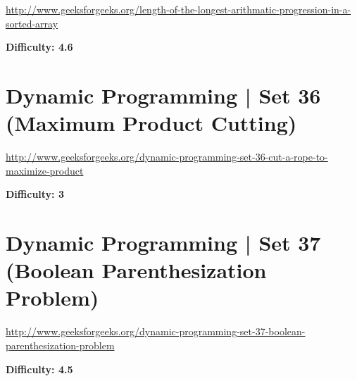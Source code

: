 \url{http://www.geeksforgeeks.org/length-of-the-longest-arithmatic-progression-in-a-sorted-array}

\textbf{Difficulty: 4.6}


\textbf{}

\RayNotesBegin



\RayNotesEnd

\textbf{}


\section{Dynamic Programming | Set 36 (Maximum Product Cutting)
  \label{secGFGDPSet36MaxProdCut}}

\url{http://www.geeksforgeeks.org/dynamic-programming-set-36-cut-a-rope-to-maximize-product}

\textbf{Difficulty: 3}

\textbf{}

\RayNotesBegin



\RayNotesEnd

\textbf{}



\section{Dynamic Programming | Set 37 (Boolean Parenthesization Problem)
  \label{secGFGDPSet37BoolParenProb}}

\url{http://www.geeksforgeeks.org/dynamic-programming-set-37-boolean-parenthesization-problem}

\textbf{Difficulty: 4.5}


\textbf{}

